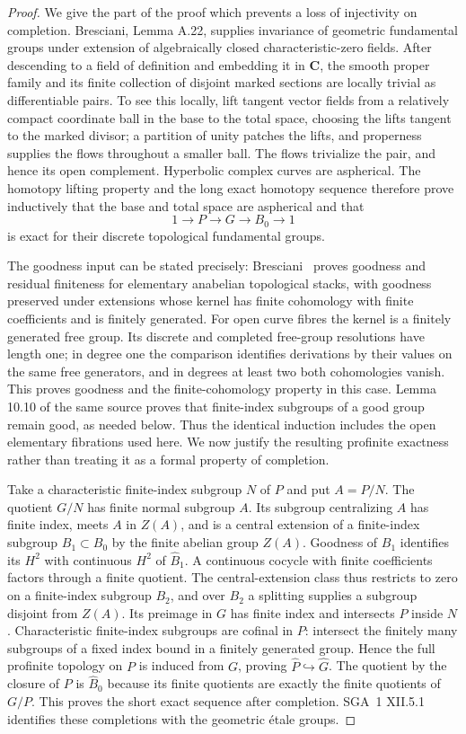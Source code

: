 \begin{proof}
We give the part of the proof which prevents a loss of injectivity on completion. Bresciani, Lemma A.22, supplies invariance of geometric fundamental groups under extension of algebraically closed characteristic-zero fields. After descending to a field of definition and embedding it in $\mathbf C$, the smooth proper family and its finite collection of disjoint marked sections are locally trivial as differentiable pairs. To see this locally, lift tangent vector fields from a relatively compact coordinate ball in the base to the total space, choosing the lifts tangent to the marked divisor; a partition of unity patches the lifts, and properness supplies the flows throughout a smaller ball. The flows trivialize the pair, and hence its open complement. Hyperbolic complex curves are aspherical. The homotopy lifting property and the long exact homotopy sequence therefore prove inductively that the base and total space are aspherical and that
\[
 1\to P\to G\to B_0\to1
\]
is exact for their discrete topological fundamental groups.

The goodness input can be stated precisely: Bresciani~\cite[Lemmas 10.9 and 10.11]{Bresciani2021} proves goodness and residual finiteness for elementary anabelian topological stacks, with goodness preserved under extensions whose kernel has finite cohomology with finite coefficients and is finitely generated. For open curve fibres the kernel is a finitely generated free group. Its discrete and completed free-group resolutions have length one; in degree one the comparison identifies derivations by their values on the same free generators, and in degrees at least two both cohomologies vanish. This proves goodness and the finite-cohomology property in this case. Lemma 10.10 of the same source proves that finite-index subgroups of a good group remain good, as needed below. Thus the identical induction includes the open elementary fibrations used here. We now justify the resulting profinite exactness rather than treating it as a formal property of completion.

Take a characteristic finite-index subgroup $N$ of $P$ and put $A=P/N$. The quotient $G/N$ has finite normal subgroup $A$. Its subgroup centralizing $A$ has finite index, meets $A$ in $Z(A)$, and is a central extension of a finite-index subgroup $B_1\subset B_0$ by the finite abelian group $Z(A)$. Goodness of $B_1$ identifies its $H^2$ with continuous $H^2$ of $\widehat B_1$. A continuous cocycle with finite coefficients factors through a finite quotient. The central-extension class thus restricts to zero on a finite-index subgroup $B_2$, and over $B_2$ a splitting supplies a subgroup disjoint from $Z(A)$. Its preimage in $G$ has finite index and intersects $P$ inside $N$. Characteristic finite-index subgroups are cofinal in $P$: intersect the finitely many subgroups of a fixed index bound in a finitely generated group. Hence the full profinite topology on $P$ is induced from $G$, proving $\widehat P\hookrightarrow\widehat G$. The quotient by the closure of $P$ is $\widehat B_0$ because its finite quotients are exactly the finite quotients of $G/P$. This proves the short exact sequence after completion. SGA~1 XII.5.1 identifies these completions with the geometric étale groups.


\end{proof}
